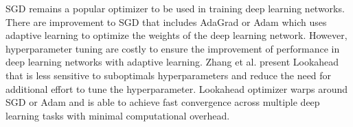 SGD remains a popular optimizer to be used in training deep learning networks. There are improvement to SGD that includes AdaGrad \cite{ref9} or Adam \cite{ref10} which uses adaptive learning to optimize the weights of the deep learning network. However, hyperparameter tuning are costly to ensure the improvement of performance in deep learning networks with adaptive learning. Zhang et al. \cite{ref11} present Lookahead that is less sensitive to suboptimals hyperparameters and reduce the need for additional effort to tune the hyperparameter. Lookahead optimizer warps around SGD or Adam and is able to achieve fast convergence across multiple deep learning tasks with minimal computational overhead.

